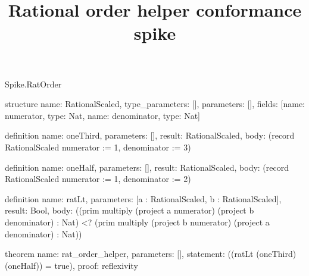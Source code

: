 \begin{lexlean}{Spike.RatOrder}
\title{Rational order helper conformance spike}
\begin{semanticmodule}
structure{
  name: RationalScaled,
  type_parameters: [],
  parameters: [],
  fields: [{name: numerator, type: Nat}, {name: denominator, type: Nat}]
}

definition{
  name: oneThird,
  parameters: [],
  result: RationalScaled,
  body: (record RationalScaled {numerator := 1, denominator := 3})
}

definition{
  name: oneHalf,
  parameters: [],
  result: RationalScaled,
  body: (record RationalScaled {numerator := 1, denominator := 2})
}

definition{
  name: ratLt,
  parameters: [a : RationalScaled, b : RationalScaled],
  result: Bool,
  body: ((prim multiply (project a numerator) (project b denominator) : Nat) <? (prim multiply (project b numerator) (project a denominator) : Nat))
}

theorem{
  name: rat_order_helper,
  parameters: [],
  statement: ((ratLt (oneThird) (oneHalf)) = true),
  proof: reflexivity{}
}
\end{semanticmodule}
\end{lexlean}
